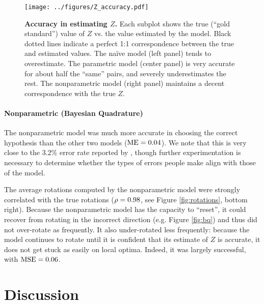\documentclass{article} %
\newcommand{\naive}[0]{na\"ive}
\begin{document}
\begin{figure}[t]
  \centering
  \texttt{[image: ../figures/Z\_accuracy.pdf]}
  \caption{\textbf{Accuracy in estimating $Z$.} Each subplot shows the
    true (``gold standard'') value of $Z$ vs. the value estimated by
    the model. Black dotted lines indicate a perfect 1:1
    correspondence between the true and estimated values. The \naive{}
    model (left panel) tends to overestimate. The parametric model
    (center panel) is very accurate for about half the ``same'' pairs,
    and severely underestimates the rest. The nonparametric model
    (right panel) maintains a decent correspondence with the true
    $Z$.}
  \label{fig:accuracy}
\end{figure}


\paragraph{Nonparametric (Bayesian Quadrature)}

The nonparametric model was much more accurate in choosing the correct
hypothesis than the other two models ($\mathrm{ME}{}=0.04{}$). We note that this is
very close to the 3.2\% error rate reported by \cite{Shepard1971},
though further experimentation is necessary to determine whether the
types of errors people make align with those of the model.

The average rotations computed by the nonparametric model were
strongly correlated with the true rotations ($\rho=0.98$, see Figure
\ref{fig:rotations}, bottom right). Because the nonparametric model
has the capacity to ``reset'', it could recover from rotating in the
incorrect direction (e.g. Figure \ref{fig:bq}) and thus did not
over-rotate as frequently.  It also under-rotated less frequently:
because the model continues to rotate until it is confident that its
estimate of $Z$ is accurate, it does not get stuck as easily on local
optima.  Indeed, it was largely successful, with $\mathrm{MSE}{}=0.06{}$.


\section{Discussion}
\end{document}
